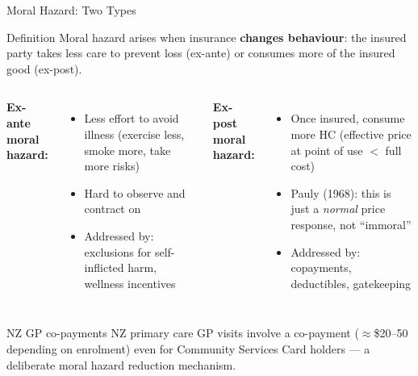 \documentclass[aspectratio=169, 12pt]{beamer}
\begin{document}
\begin{frame}{Moral Hazard: Two Types}
  \begin{block}{Definition}
    Moral hazard arises when insurance \textbf{changes behaviour}: the insured party
    takes less care to prevent loss (ex-ante) or consumes more of the insured good (ex-post).
  \end{block}
  \begin{columns}
      \textbf{Ex-ante moral hazard:}
      \begin{itemize}
        \item Less effort to avoid illness (exercise less, smoke more, take more risks)
        \item Hard to observe and contract on
        \item Addressed by: exclusions for self-inflicted harm, wellness incentives
      \end{itemize}
      \textbf{Ex-post moral hazard:}
      \begin{itemize}
        \item Once insured, consume more HC (effective price at point of use $<$ full cost)
        \item Pauly (1968): this is just a \emph{normal} price response, not ``immoral''
        \item Addressed by: copayments, deductibles, gatekeeping
      \end{itemize}
  \end{columns}
  \begin{exampleblock}{NZ GP co-payments}
    NZ primary care GP visits involve a co-payment ($\approx$\$20--50 depending on enrolment)
    even for Community Services Card holders --- a deliberate moral hazard reduction mechanism.
  \end{exampleblock}
\end{frame}
\end{document}

